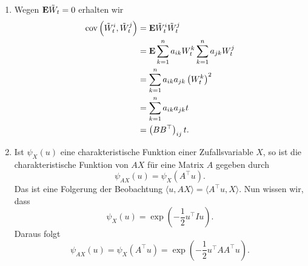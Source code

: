 \solution
\begin{enumerate}
    \item Wegen $\mathbf{E} \tilde W_t=0$ erhalten wir 
        \begin{align*}
            \operatorname{cov} \left( \tilde W_t^{i}, \tilde W_t^{j} \right) 
            &= \mathbf{E} \tilde W_t^i \tilde W_t^j \\
            &= \mathbf{E} \sum_{k=1}^{n} a_{ik} W_t^k \sum_{k=1}^{n} a_{jk} W_t^j \\
            &= \sum_{k=1}^{n} a_{ik} a_{jk} \left( W_t^k \right)^2 \\
            &= \sum_{k=1}^{n} a_{ik} a_{jk} t \\
            &= \left( B B^\top \right)_{ij} t.
        \end{align*}
    \item Ist $\psi_X(u)$ eine charakteristische Funktion einer Zufallsvariable 
        $X$, so ist die charakteristische Funktion von $AX$ für eine Matrix $A$ gegeben
        durch
        \begin{equation*}
            \psi_{AX}(u) = \psi_{X}(A^\top u). 
        \end{equation*}
        Das ist eine Folgerung der Beobachtung $\langle u, AX \rangle = \langle
        A^\top u, X \rangle$. Nun wissen wir, dass
        \begin{equation*}
            \psi_X(u) = \exp \left( - \frac{1}{2} u^\top I u \right). 
        \end{equation*}
        Daraus folgt
        \begin{equation*}
            \psi_{AX}(u) = \psi_X(A^\top u) = 
            \exp \left( -\frac{1}{2} u^\top AA^\top u \right).
        \end{equation*}
\end{enumerate}


